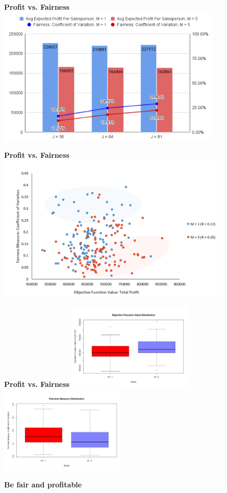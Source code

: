 \begin{frame}{\textbf{Profit vs. Fairness}}
\centering\includegraphics[width=0.8\textwidth]{fairness_1.png}
\end{frame}

\begin{frame}{\textbf{Profit vs. Fairness}}
\centering\includegraphics[width=0.85\textwidth]{fairness_2.png}
\end{frame}

\begin{frame}{\textbf{Profit vs. Fairness}}
\centering\includegraphics[width=0.45\textwidth]{obj.png}
\includegraphics[width=0.45\textwidth]{fair.png}
\end{frame}

\begin{frame}
  \centering
 \Large  \textbf{Be fair and profitable}
\end{frame}



